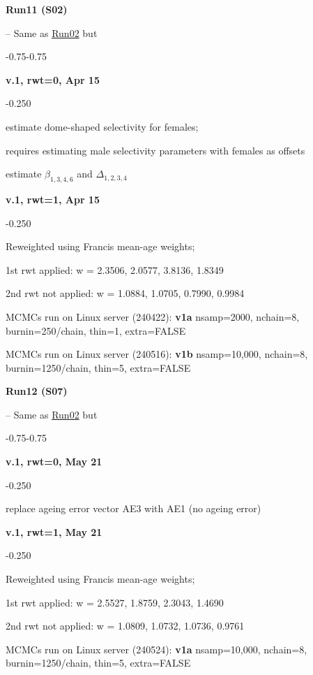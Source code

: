 \hypertarget{R11}{\textbf{Run11 (S02)}} -- Same as \hyperlink{R02}{Run02} but
\begin{itemize_csas}{-0.75}{-0.75}
	\item \textbf{v.1, rwt=0, Apr 15}
	\begin{itemize_csas}{-0.25}{0}
		\item estimate dome-shaped selectivity for females;
		\item requires estimating male selectivity parameters with females as offsets
		\item estimate $\beta_{1,3,4,6}$ and $\Delta_{1,2,3,4}$
	\end{itemize_csas}
	\item \textbf{v.1, rwt=1, Apr 15}
	\begin{itemize_csas}{-0.25}{0}
		\item Reweighted using Francis mean-age weights;
		\item 1st rwt applied: w = 2.3506, 2.0577, 3.8136, 1.8349
		\item 2nd rwt not applied: w = 1.0884, 1.0705, 0.7990, 0.9984
		\item MCMCs run on Linux server (240422): \textbf{v1a} nsamp=2000, nchain=8, burnin=250/chain, thin=1, extra=FALSE
		\item MCMCs run on Linux server (240516): \textbf{v1b} nsamp=10,000, nchain=8, burnin=1250/chain, thin=5, extra=FALSE
	\end{itemize_csas}
\end{itemize_csas}

\hypertarget{R12}{\textbf{Run12 (S07)}} -- Same as \hyperlink{R02}{Run02} but
\begin{itemize_csas}{-0.75}{-0.75}
	\item \textbf{v.1, rwt=0, May 21}
	\begin{itemize_csas}{-0.25}{0}
		\item replace ageing error vector AE3 with AE1 (no ageing error)
	\end{itemize_csas}
	\item \textbf{v.1, rwt=1, May 21}
	\begin{itemize_csas}{-0.25}{0}
		\item Reweighted using Francis mean-age weights;
		\item 1st rwt applied: w = 2.5527, 1.8759, 2.3043, 1.4690
		\item 2nd rwt not applied: w = 1.0809, 1.0732, 1.0736, 0.9761
		\item MCMCs run on Linux server (240524): \textbf{v1a} nsamp=10,000, nchain=8, burnin=1250/chain, thin=5, extra=FALSE
	\end{itemize_csas}
\end{itemize_csas}

